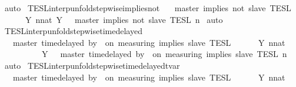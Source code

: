 \begin{isabellebody}
%
\isadelimproof
%
\endisadelimproof
%
\isatagproof
{}\isamarkupfalse%
\ auto%
\endisatagproof
{\isafoldproof}%
%
\isadelimproof
\isanewline
%
\endisadelimproof
\isanewline
{}\isamarkupfalse%
\ TESL{\isacharunderscore}interp{\isacharunderscore}unfold{\isacharunderscore}stepwise{\isacharunderscore}implies{\isacharunderscore}not{\isacharcolon}\isanewline
\ \ {\isacartoucheopen}{\isasymlbrakk}\ master\ implies\ not\ slave\ {\isasymrbrakk}\isactrlsub T\isactrlsub E\isactrlsub S\isactrlsub L\isanewline
\ \ \ \ {\isacharequal}\ {\isasymInter}\ {\isacharbraceleft}Y{\isachardot}\ {\isasymexists}n{\isacharcolon}{\isacharcolon}nat{\isachardot}\ Y\ {\isacharequal}\ {\isasymlbrakk}\ master\ implies\ not\ slave\ {\isasymrbrakk}\isactrlsub T\isactrlsub E\isactrlsub S\isactrlsub L\isactrlbsup {\isasymge}\ n\isactrlesup {\isacharbraceright}{\isacartoucheclose}\isanewline
%
\isadelimproof
%
\endisadelimproof
%
\isatagproof
{}\isamarkupfalse%
\ auto%
\endisatagproof
{\isafoldproof}%
%
\isadelimproof
\isanewline
%
\endisadelimproof
\isanewline
{}\isamarkupfalse%
\ TESL{\isacharunderscore}interp{\isacharunderscore}unfold{\isacharunderscore}stepwise{\isacharunderscore}timedelayed{\isacharcolon}\isanewline
\ \ {\isacartoucheopen}{\isasymlbrakk}\ master\ time{\isacharminus}delayed\ by\ {\isasymdelta}{\isasymtau}\ on\ measuring\ implies\ slave\ {\isasymrbrakk}\isactrlsub T\isactrlsub E\isactrlsub S\isactrlsub L\isanewline
\ \ \ \ {\isacharequal}\ {\isasymInter}\ {\isacharbraceleft}Y{\isachardot}\ {\isasymexists}n{\isacharcolon}{\isacharcolon}nat{\isachardot}\isanewline
\ \ \ \ \ \ \ \ \ \ Y\ {\isacharequal}\ {\isasymlbrakk}\ master\ time{\isacharminus}delayed\ by\ {\isasymdelta}{\isasymtau}\ on\ measuring\ implies\ slave\ {\isasymrbrakk}\isactrlsub T\isactrlsub E\isactrlsub S\isactrlsub L\isactrlbsup {\isasymge}\ n\isactrlesup {\isacharbraceright}{\isacartoucheclose}\isanewline
%
\isadelimproof
%
\endisadelimproof
%
\isatagproof
{}\isamarkupfalse%
\ auto%
\endisatagproof
{\isafoldproof}%
%
\isadelimproof
\isanewline
%
\endisadelimproof
\isanewline
{}\isamarkupfalse%
\ TESL{\isacharunderscore}interp{\isacharunderscore}unfold{\isacharunderscore}stepwise{\isacharunderscore}timedelayed{\isacharunderscore}tvar{\isacharcolon}\isanewline
\ \ {\isacartoucheopen}{\isasymlbrakk}\ master\ time{\isacharminus}delayed{\isasymbowtie}\ by\ {\isasymdelta}{\isasymtau}\ on\ measuring\ implies\ slave\ {\isasymrbrakk}\isactrlsub T\isactrlsub E\isactrlsub S\isactrlsub L\isanewline
\ \ \ \ {\isacharequal}\ {\isasymInter}\ {\isacharbraceleft}Y{\isachardot}\ {\isasymexists}n{\isacharcolon}{\isacharcolon}nat{\isachardot}\isanewline

\end{isabellebody}

